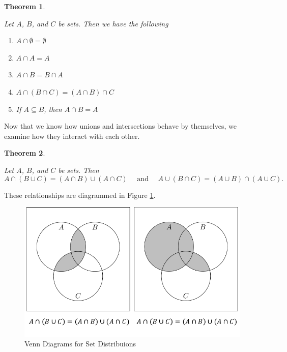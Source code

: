 \documentclass[
]{book}
\newtheorem{theorem}{Theorem}[chapter]
\theoremstyle{definition}
\theoremstyle{definition}
\theoremstyle{definition}
\theoremstyle{definition}
\theoremstyle{remark}
\begin{document}
\begin{theorem}
\protect\hypertarget{thm:intersections}{}\label{thm:intersections}

Let \(A\), \(B\), and \(C\) be sets. Then we have the following

\begin{enumerate}
\def\labelenumi{\arabic{enumi}.}
\item
  \(A\cap \emptyset = \emptyset\)
\item
  \(A \cap A = A\)
\item
  \(A \cap B = B \cap A\)
\item
  \(A \cap (B\cap C ) = (A\cap B) \cap C\)
\item
  If \(A \subseteq B\), then \(A \cap B = A\)
\end{enumerate}

\end{theorem}

Now that we know how unions and intersections behave by themselves, we examine how they interact with each other.

\begin{theorem}
\protect\hypertarget{thm:set-distribution}{}\label{thm:set-distribution}

Let \(A\), \(B\), and \(C\) be sets. Then
\[ A \cap (B \cup C) = (A \cap B) \cup (A \cap C) \quad \mbox{ and } \quad  A \cup (B \cap C) = (A \cup B) \cap (A \cup C).\]

\end{theorem}

These relationships are diagrammed in Figure \ref{fig:set-distributions}.

\begin{figure}

{\centering \includegraphics[width=0.8\linewidth]{tikz/set-distribution} 

}

\caption{Venn Diagrams for Set Distribuions }\label{fig:set-distributions}
\end{figure}
\end{document}
